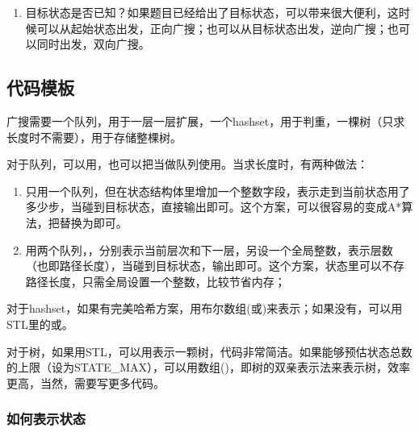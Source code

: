\begin{enumerate}
\item 目标状态是否已知？如果题目已经给出了目标状态，可以带来很大便利，这时候可以从起始状态出发，正向广搜；也可以从目标状态出发，逆向广搜；也可以同时出发，双向广搜。
\end{enumerate}


\subsection{代码模板}
广搜需要一个队列，用于一层一层扩展，一个hashset，用于判重，一棵树（只求长度时不需要），用于存储整棵树。

对于队列，可以用，也可以把当做队列使用。当求长度时，有两种做法：
\begin{enumerate}
\item 只用一个队列，但在状态结构体里增加一个整数字段，表示走到当前状态用了多少步，当碰到目标状态，直接输出即可。这个方案，可以很容易的变成A*算法，把替换为即可。
\item 用两个队列，，分别表示当前层次和下一层，另设一个全局整数，表示层数（也即路径长度），当碰到目标状态，输出即可。这个方案，状态里可以不存路径长度，只需全局设置一个整数，比较节省内存；
\end{enumerate}

对于hashset，如果有完美哈希方案，用布尔数组(或)来表示；如果没有，可以用STL里的或。

对于树，如果用STL，可以用表示一颗树，代码非常简洁。如果能够预估状态总数的上限（设为STATE_MAX），可以用数组()，即树的双亲表示法来表示树，效率更高，当然，需要写更多代码。


\subsubsection{如何表示状态}


